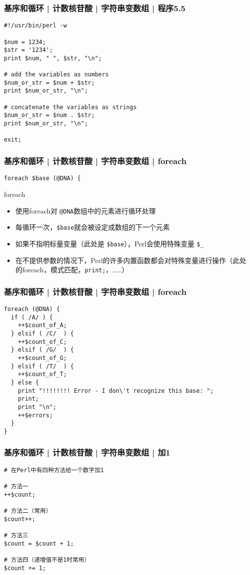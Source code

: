 \begin{frame}[fragile]
  \frametitle{基序和循环 | 计数核苷酸 | 字符串变数组 | \alert{程序5.5}}
\begin{lstlisting}
#!/usr/bin/perl -w

$num = 1234;
$str = '1234';
print $num, " ", $str, "\n";

# add the variables as numbers
$num_or_str = $num + $str;
print $num_or_str, "\n";

# concatenate the variables as strings
$num_or_str = $num . $str;
print $num_or_str, "\n";

exit;
\end{lstlisting}
\end{frame}


\begin{frame}[fragile]
  \frametitle{基序和循环 | 计数核苷酸 | 字符串变数组 | \alert{foreach}}
\begin{lstlisting}
foreach $base (@DNA) {
\end{lstlisting}
\pause
\begin{block}{foreach}
  \begin{itemize}
    \item 使用foreach对 \verb|@DNA|数组中的元素进行循环处理
    \item 每循环一次，\verb|$base|就会被设定成数组的下一个元素
    \item 如果不指明标量变量（此处是 \verb|$base|），Perl会使用特殊变量 \verb|$_|
    \item 在不提供参数的情况下，Perl的许多内置函数都会对特殊变量进行操作（此处的foreach，模式匹配，\verb|print;|，……）
  \end{itemize}
\end{block}
\end{frame}

\begin{frame}[fragile]
  \frametitle{基序和循环 | 计数核苷酸 | 字符串变数组 | foreach}
\begin{lstlisting}[basicstyle=\small\tt]
foreach (@DNA) {
  if ( /A/ ) {
    ++$count_of_A;
  } elsif ( /C/  ) {
    ++$count_of_C;
  } elsif ( /G/  ) {
    ++$count_of_G;
  } elsif ( /T/  ) {
    ++$count_of_T;
  } else {
    print "!!!!!!!! Error - I don\'t recognize this base: ";
    print;
    print "\n";
    ++$errors;
  }
}
\end{lstlisting}
\end{frame}

\begin{frame}[fragile]
  \frametitle{基序和循环 | 计数核苷酸 | 字符串变数组 | \alert{加1}}
\begin{lstlisting}
# 在Perl中有四种方法给一个数字加1

# 方法一
++$count;

# 方法二（常用）
$count++;

# 方法三
$count = $count + 1;

# 方法四（递增值不是1时常用）
$count += 1;
\end{lstlisting}
\end{frame}

